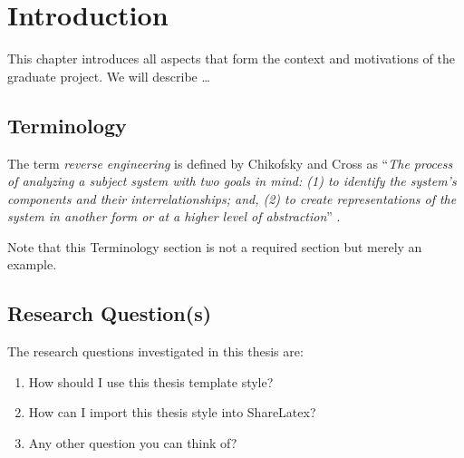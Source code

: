 \chapter{\label{cha:intro}Introduction}

This chapter introduces all aspects that form the context and
motivations of the graduate project. We will describe \ldots

\section{Terminology}

The term \emph{reverse engineering} is defined by Chikofsky and Cross as
``\emph{The process of analyzing a subject system with two goals in mind:
(1) to identify the system's components and their interrelationships; and,
(2) to create representations of the system in another form or at a higher
level of abstraction}'' \cite{CC90}.

Note that this Terminology section is not a required section but
merely an example.

\section{Research Question(s)}

The research questions investigated in this thesis are:

\begin{enumerate}[label=\textbf{RQ\arabic*}]
\item How should I use this thesis template style?
\item How can I import this thesis style into ShareLatex?
\item Any other question you can think of?
\end{enumerate}

